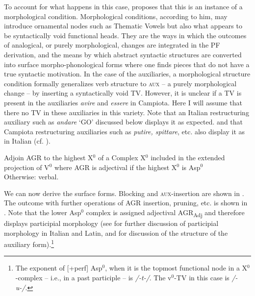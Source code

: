 \documentclass[output=paper]{langscibook}
\begin{document}
{To account for what happens in this case, \citet{calabrese2019a, calabrese2020a} proposes  that this is an instance of a morphological condition. Morphological conditions, according to him, may introduce ornamental nodes such as Thematic Vowels but also what appears to be syntactically void functional heads. They are the ways in which the outcomes of analogical, or purely morphological, changes are integrated in the PF derivation, and the means by which abstract syntactic structures are converted into surface morpho-phonological forms where one finds pieces that do not have a true syntactic motivation. In the case of the auxiliaries, a morphological structure condition formally generalizes verb structure to \textsc{aux} --  a purely morphological change  --  by inserting a syntactically void TV. However, it is unclear if a TV is present in the auxiliaries \textit{avire} and \textit{essere} in Campiota. Here I will assume that there no TV in these auxiliaries in this variety.  Note that an Italian restructuring auxiliary such as \textit{andare} ‘GO’ discussed below displays it as expected. and that Campiota restructuring auxiliaries such as \textit{putire, spittare}, etc. also display it as in Italian (cf. ).}

\ea \label{ac75} Adjoin AGR to the highest X$^0$ of a Complex X$^0$ included in the extended projection of V$^0$
    \ea \label{ac75a}where AGR is adjectival if the highest X$^0$ is Asp$^0$\\
        Otherwise:
    \ex \label{ac75b}verbal.
   \z
\z

We can now derive the surface forms. Blocking and \textsc{aux}-insertion are shown in .  The outcome with further operations of AGR insertion, pruning, etc. is shown in .  Note that the lower Asp$^0$ complex is assigned adjectival AGR\textsubscript{Adj} and therefore displays participial morphology (see \citet{calabrese2020a} for further discussion of participial morphology in Italian and Latin, and \citet{calabrese2019a} for discussion of the structure of the auxiliary form).\footnote{The exponent of [+perf] Asp$^0$, when it is the topmost functional node in a X$^0$-complex -- i.e., in a past participle --  is \textit{/-t-/}.  The v$^0$-TV in this case is \textit{/-u-/}.}
\end{document}
